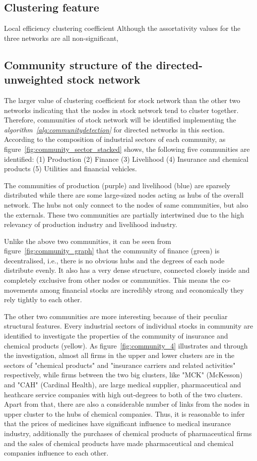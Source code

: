 \subsection{Clustering feature}
Local efficiency 
clustering coefficient
Although the assortativity values for the three networks are all non-significant, 

\subsection{Community structure of the directed-unweighted stock network}
The larger value of clustering coefficient for stock network than the other two networks indicating that the nodes in stock network tend to cluster together. Therefore, communities of stock network will be identified implementing the \textit{algorithm~\ref{alg:communitydetection}} for directed networks in this section. According to the composition of industrial sectors of each community, as figure~\ref{fig:community_sector_stacked} shows, the following five communities are identified: (1) Production (2) Finance (3) Livelihood (4) Insurance and chemical products (5) Utilities and financial vehicles.

The communities of production (purple) and livelihood (blue) are sparsely distributed while there are some large-sized nodes acting as hubs of the overall network. The hubs not only connect to the nodes of same communities, but also the externals. These two communities are partially intertwined due to the high relevancy of production industry and livelihood industry. 

Unlike the above two communities, it can be seen from figure~\ref{fig:community_graph} that the community of finance (green) is decentralised, i.e., there is no obvious hubs and the degrees of each node distribute evenly. It also has a very dense structure, connected closely inside and completely exclusive from other nodes or communities. This means the co-movements among financial stocks are incredibly strong and economically they rely tightly to each other.

The other two communities are more interesting because of their peculiar structural features. Every industrial sectors of individual stocks in community are identified to investigate the properties of the community of insurance and chemical products (yellow). As figure~\ref{fig:community_4} illustrates and through the investigation, almost all firms in the upper and lower clusters are in the sectors of "chemical products" and "insurance carriers and related activities" respectively, while firms between the two big clusters, like "MCK" (McKesson) and "CAH" (Cardinal Health), are large medical supplier, pharmaceutical and heathcare service companies with high out-degrees to both of the two clusters. Apart from that, there are also a considerable number of links from the nodes in upper cluster to the hubs of chemical companies. Thus, it is reasonable to infer that the prices of medicines have significant influence to medical insurance industry, additionally the purchases of chemical products of pharmaceutical firms and the sales of chemical products have made pharmaceutical and chemical companies influence to each other.

